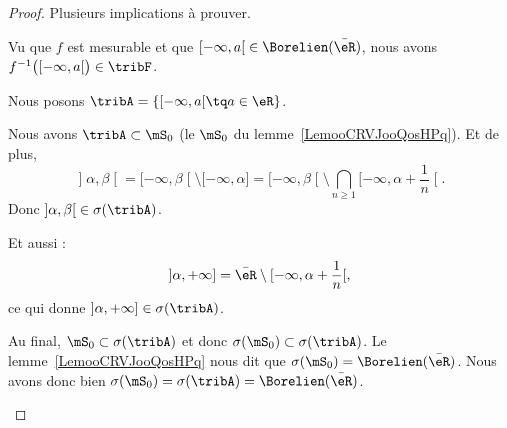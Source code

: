 \begin{proof}
    Plusieurs implications à prouver.
    \begin{subproof}
        \item[\ref{ITEMooHAMHooYLqUhVi}\( \Rightarrow\)\ref{ITEMooHAMHooYLqUhVii}]
            Vu que \( f\) est mesurable et que \( \mathopen[ -\infty , a \mathclose[\in\Borelien(\bar\eR)\), nous avons \( f^{-1}\big( \mathopen[ -\infty , a \mathclose[ \big)\in\tribF\).
        \item[\ref{ITEMooHAMHooYLqUhVii}\( \Rightarrow\)\ref{ITEMooHAMHooYLqUhVi}]
            Nous posons \( \tribA=\{ \mathopen[ -\infty , a \mathclose[\tq a\in \eR \}\).

                Nous avons \( \tribA\subset\mS_0\) (le \( \mS_0\) du lemme~\ref{LemooCRVJooQosHPq}). Et de plus,
            \begin{equation}
            \mathopen] \alpha , \beta \mathclose[=\mathopen[ -\infty , \beta \mathclose[\setminus\mathopen[ -\infty , \alpha \mathclose]=\mathopen[ -\infty , \beta \mathclose[\setminus\bigcap_{n\geq 1}\mathopen[ -\infty , \alpha+\frac{1}{ n } \mathclose[.
            \end{equation}
        Donc \( \mathopen] \alpha , \beta \mathclose[\in\sigma(\tribA)\).

            Et aussi :
            \begin{equation}
                \mathopen] \alpha , +\infty \mathclose]=\bar\eR\setminus\mathopen[ -\infty , \alpha+\frac{1}{ n } \mathclose[,
            \end{equation}
        ce qui donne \( \mathopen] \alpha , +\infty \mathclose]\in \sigma(\tribA)\).

        Au final, \( \mS_0\subset\sigma(\tribA)\) et donc \( \sigma(\mS_0)\subset\sigma(\tribA)\). Le lemme~\ref{LemooCRVJooQosHPq} nous dit que \( \sigma(\mS_0)=\Borelien(\bar \eR)\). Nous avons donc bien \( \sigma(\mS_0)=\sigma(\tribA)=\Borelien(\bar\eR)\).


\end{subproof}
\end{proof}
